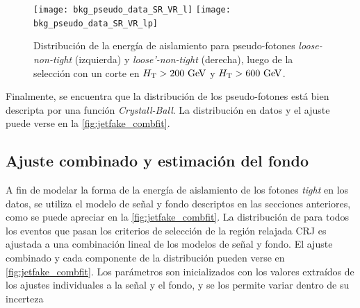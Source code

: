 \begin{figure}[!htbp]
  \centering

  \texttt{[image: bkg\_pseudo\_data\_SR\_VR\_l]}
  \texttt{[image: bkg\_pseudo\_data\_SR\_VR\_lp]}

  \caption{Distribución de la energía de aislamiento para pseudo-fotones
    \emph{loose-non-tight} (izquierda) y \emph{loose'-non-tight} (derecha),
    luego de la selección con un corte en $\HT>200 \gev$ y $\HT>600 \gev$.}
  \label{fig:jetfake_pseudo_data_LR_VR}

\end{figure}

Finalmente, se encuentra que la distribución de los pseudo-fotones está bien
descripta por una función \emph{Crystall-Ball}. La
distribución en datos y el ajuste puede verse en la \cref{fig:jetfake_combfit}.




\subsection{Ajuste combinado y estimación del fondo} \label{sec:jet_fake_results}


A fin de modelar la forma de la energía de aislamiento de los fotones
\emph{tight} en los datos, se utiliza el modelo de señal y fondo descriptos en
las secciones anteriores, como se puede apreciar en la
\cref{fig:jetfake_combfit}. La distribución de {\etiso} para todos los eventos
que pasan los criterios de selección de la región relajada CRJ es ajustada a una
combinación lineal de los modelos de señal y fondo. El ajuste combinado y cada
componente de la distribución pueden verse en \cref{fig:jetfake_combfit}. Los
parámetros son inicializados con los valores extraídos de los ajustes
individuales a la señal y el fondo, y se los permite variar dentro de su
incerteza

